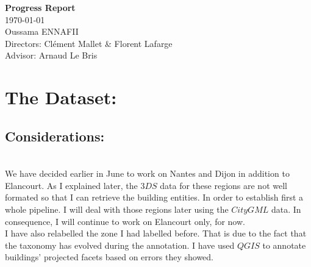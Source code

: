 \documentclass[a4paper, 11pt]{article}
\begin{document}
	\begin{centering}
		\Large{\textbf{Progress Report}}\\
		\large{\today}
~\\
		Oussama ENNAFII\\
		Directors: Cl\'ement Mallet \& Florent Lafarge \\
		Advisor: Arnaud Le Bris \\

	\end{centering}


	\section{The Dataset:}
	\subsection{Considerations:}
~\\

	We have decided earlier in June to work on Nantes and Dijon in addition to
	Elancourt. As I explained later, the $3DS$ data for these regions are not
	well formated so that I can retrieve the building entities. In order to
	establish first a whole pipeline. I will deal with those regions later using
	the $CityGML$ data. In consequence, I will continue to work on Elancourt
	only, for now.\\

	I have also relabelled the zone I had labelled before. That is due to the fact
	that the taxonomy has evolved during the annotation. I have used $QGIS$ to
	annotate buildings' projected facets based on errors they showed.\\
\end{document}
